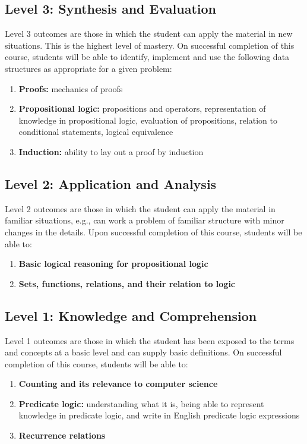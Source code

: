 \documentclass[12pt]{scrartcl}
\begin{document}
\subsection*{Level 3: Synthesis and Evaluation}
Level 3 outcomes are those in which the student can apply the material in new situations. This is the highest level of mastery. On successful completion of this course, students will be able to identify, implement and use the following data structures as appropriate for a given problem:
\begin{enumerate}
\item \textbf{Proofs:} mechanics of proofs
\item \textbf{Propositional logic:} propositions and operators, representation of knowledge in propositional logic,
evaluation of propositions, relation to conditional statements, logical equivalence
\item \textbf{Induction:} ability to lay out a proof by induction
\end{enumerate}

\subsection*{Level 2: Application and Analysis}
Level 2 outcomes are those in which the student can apply the material in familiar situations, e.g., can work a problem of familiar structure with minor changes in the details. Upon successful completion of this course, students will be able to:
\begin{enumerate}
\item \textbf{Basic logical reasoning for propositional logic}
\item \textbf{Sets, functions, relations, and their relation to logic}
\end{enumerate}

\subsection*{Level 1: Knowledge and Comprehension}
Level 1 outcomes are those in which the student has been exposed to the terms and concepts at a basic level and can supply basic definitions. On successful completion of this course, students will be able to:
\begin{enumerate}
\item \textbf{Counting and its relevance to computer science}
\item \textbf{Predicate logic:} understanding what it is, being able to represent knowledge in predicate logic, and write in
English predicate logic expressions
\item \textbf{Recurrence relations}
\end{enumerate}


\end{document}
